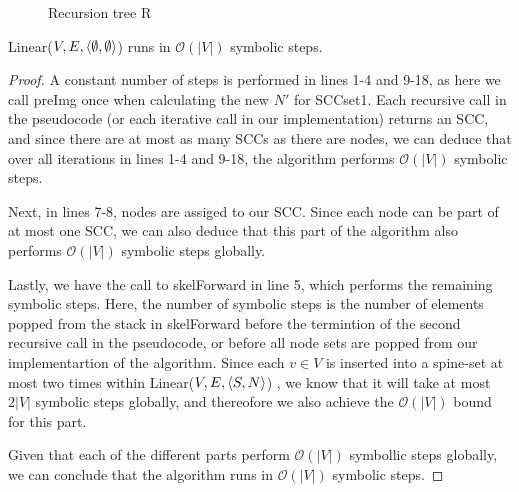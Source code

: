 \documentclass[../master/master.tex]{subfiles}
\begin{document}
\begin{figure}
  \centering
{}
\caption{Recursion tree R}
\label{R}
\end{figure}

\begin{theorem}\label{linear} Linear($V, E, \langle \emptyset, \emptyset\rangle$) runs in $\mathcal{O}(|V|)$ symbolic steps.
\end{theorem}
\begin{proof} A constant number of steps is performed in lines 1-4 and 9-18, as here we call preImg once when calculating the new $N'$ for SCCset1. Each recursive call in the pseudocode (or each iterative call in our implementation) returns an SCC, and since there are at most as many SCCs as there are nodes, we can deduce that over all iterations in lines 1-4 and 9-18, the algorithm performs $\mathcal{O}(|V|)$ symbolic steps.

Next, in lines 7-8, nodes are assiged to our SCC. Since each node can be part of at most one SCC, we can also deduce that this part of the algorithm also performs $\mathcal{O}(|V|)$ symbolic steps globally.

Lastly, we have the call to skelForward in line 5, which performs the remaining symbolic steps. Here, the number of symbolic steps is the number of elements popped from the stack in skelForward before the termintion of the second recursive call in the pseudocode, or before all node sets are popped from our implementartion of the algorithm. Since each $v\in V$ is inserted into a spine-set at most two times within Linear($V, E, \langle S, N\rangle$) \cite[p.~137-138]{linear}, we know that it will take at most $2|V|$ symbolic steps globally, and thereofore we also achieve the $\mathcal{O}(|V|)$ bound for this part.

Given that each of the different parts perform $\mathcal{O}(|V|)$ symbollic steps globally, we can conclude that the algorithm runs in $\mathcal{O}(|V|)$ symbolic steps.
\end{proof}
\end{document}
